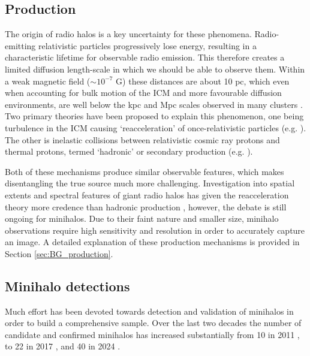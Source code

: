 \subsection{Production}
The origin of radio halos is a key uncertainty for these phenomena. Radio-emitting relativistic particles progressively lose energy, resulting in a characteristic lifetime for observable radio emission. This therefore creates a limited diffusion length-scale in which we should be able to observe them. Within a weak magnetic field ($\sim10^{-7}$ G) these distances are about 10 pc, which even when accounting for bulk motion of the ICM and more favourable diffusion environments, are well below the kpc and Mpc scales observed in many clusters \citep{Bagchi2002}. Two primary theories have been proposed to explain this phenomenon, one being turbulence in the ICM causing `reacceleration' of once-relativistic particles (e.g. \citealp{Brunetti2001,Gitti2002,ZuHone2013,Zandanel2014}). The other is inelastic collisions between relativistic cosmic ray protons and thermal protons, termed `hadronic' or secondary production (e.g. \citealp{Dennison1980,Dolag2000,Keshet2010,ZuHone2015,Ignesti2020}). 

Both of these mechanisms produce similar observable features, which makes disentangling the true source much more challenging. Investigation into spatial extents and spectral features of giant radio halos has given the reacceleration theory more credence than hadronic production \citep{Brunetti2012}, however, the debate is still ongoing for minihalos. Due to their faint nature and smaller size, minihalo observations require high sensitivity and resolution in order to accurately capture an image. A detailed explanation of these production mechanisms is provided in Section \ref{sec:BG_production}. 

\subsection{Minihalo detections}
Much effort has been devoted towards detection and validation of minihalos in order to build a comprehensive sample. Over the last two decades the number of candidate and confirmed minihalos has increased substantially from 10 in 2011 \citep{Ferreti2012}, to 22 in 2017 \citep{Giacintucci2014}, and 40 in 2024 \citep{Giacintucci2024}. 

